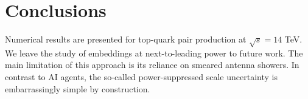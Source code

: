 \section{Conclusions}\label{sec:conclusions}

Numerical results are presented for top-quark pair production at
$\sqrt{s} = 14$ TeV. We leave the study of embeddings at next-to-leading
power to future work. The main limitation of this approach is its
reliance on smeared antenna showers. In contrast to AI agents, the
so-called power-suppressed scale uncertainty is embarrassingly simple by
construction.

